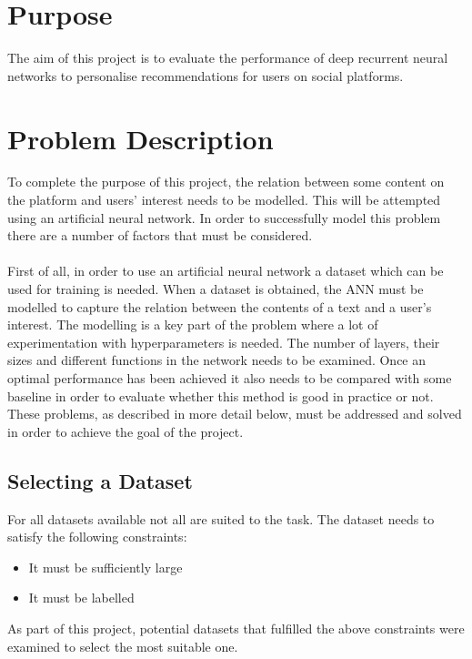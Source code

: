 \section{Purpose}
The aim of this project is to evaluate the performance of deep recurrent neural networks to personalise recommendations for users on social platforms.

\section{Problem Description}
To complete the purpose of this project, the relation between some content on the platform and users' interest needs to be modelled. This will be attempted using an artificial neural network. In order to successfully model this problem there are a number of factors that must be considered.
\\\\
First of all, in order to use an artificial neural network a dataset which can be used for training is needed. When a dataset is obtained, the ANN must be modelled to capture the relation between the contents of a text and a user's interest. The modelling is a key part of the problem where a lot of experimentation with hyperparameters is needed. The number of layers, their sizes and different functions in the network needs to be examined. Once an optimal performance has been achieved it also needs to be compared with some baseline in order to evaluate whether this method is good in practice or not. These problems, as described in more detail below,  must be addressed and solved in order to achieve the goal of the project.

\subsection{Selecting a Dataset}\label{sec:select_dataset}
For all datasets available not all are suited to the task. The dataset needs to satisfy the following constraints: 
\vspace*{0.25cm}
\begin{itemize}
    \item It must be sufficiently large
    \item It must be labelled
\end{itemize}
\vspace*{0.25cm}
As part of this project, potential datasets that fulfilled the above constraints were examined to select the most suitable one.

